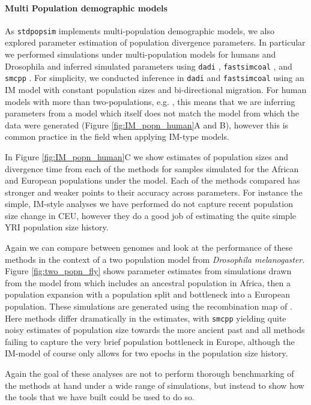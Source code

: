 \documentclass[12pt,halfline,a4paper]{ouparticle}
\newcommand{\dadi}{\texttt{dadi} }
\newcommand{\smcpp}{\texttt{smcpp} }
\newcommand{\fastsimcoal}{\texttt{fastsimcoal} }
\begin{document}
\paragraph*{Multi Population demographic models}
As \texttt{stdpopsim} implements multi-population demographic models, we also
explored parameter estimation of population divergence parameters. In particular
we performed simulations under multi-population models for humans and Drosophila
and inferred simulated parameters using \dadi, \fastsimcoal, and \smcpp.
For simplicity, we conducted inference in \dadi and \fastsimcoal using an IM model
with constant population sizes and bi-directional migration. For human
models with more than two-populations, e.g. \cite{gutenkunst2009inferring},
this means that we are inferring parameters from a model which itself does
not match the model from which the data were generated (Figure
\ref{fig:IM_popn_human}A and B), however this is common practice in the field
when applying IM-type models.

In Figure \ref{fig:IM_popn_human}C we show estimates of population sizes and divergence
time from each of the methods for samples simulated for the African and European populations
under the \cite{gutenkunst2009inferring} model. Each of the methods compared has stronger
and weaker points to their accuracy across parameters. For instance the simple, IM-style
analyses we have performed do not capture recent population size change in CEU, however
they do a good job of estimating the quite simple YRI population size history.

Again we can compare between genomes and look at the performance of these methods in
the context of a two population model from \emph{Drosophila melanogaster}. Figure
\ref{fig:two_popn_fly} shows parameter estimates from simulations drawn from
the model from \cite{li2006inferring} which includes
an ancestral population in Africa, then a population expansion with a population
split and bottleneck into a European population. These simulations are generated
using the recombination map of \cite{comeron2012many}. Here methods differ dramatically
in the estimates, with \smcpp yielding quite noisy estimates of population size
towards the more ancient past and all methods failing to capture the very brief
population bottleneck in Europe, although the IM-model of course only allows for
two epochs in the population size history.

Again the goal of these analyses are not to perform thorough benchmarking of
the methods at hand under a wide range of simulations, but instead to show how
the tools that we have built could be used to do so.
\end{document}
